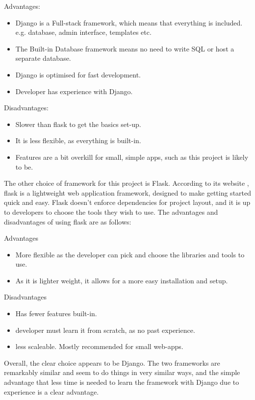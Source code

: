 \documentclass{l4proj}
\begin{document}
Advantages:
\begin{itemize}
    \item 
    Django is a Full-stack framework, which means that everything is included. e.g. database, admin interface, templates etc.
    \item 
    The Built-in Database framework means no need to write SQL or host a separate database.
    \item 
    Django is optimised for fast development.
    \item 
    Developer has experience with Django.
\end{itemize}
Disadvantages:
\begin{itemize}
    \item 
    Slower than flask to get the basics set-up.
    \item 
    It is less flexible, as everything is built-in.
    \item 
    Features are a bit overkill for small, simple apps, such as this project is likely to be.
\end{itemize}

The other choice of framework for this project is Flask. According to its website \citep{flask}, flask is a lightweight web application framework, designed to make getting started quick and easy. Flask doesn't enforce dependencies for project layout, and it is up to developers to choose the tools they wish to use. The advantages and disadvantages of using flask are as follows:

Advantages
\begin{itemize}
    \item 
    More flexible as the developer can pick and choose the libraries and tools to use.   
    \item
    As it is lighter weight, it allows for a more easy installation and setup.
\end{itemize}
Disadvantages
\begin{itemize}
    \item 
    Has fewer features built-in.
    \item 
    developer must learn it from scratch, as no past experience.  
    \item 
    less scaleable. Mostly recommended for small web-apps.
\end{itemize}

Overall, the clear choice appears to be Django. The two frameworks are remarkably similar and seem to do things in very similar ways, and the simple advantage that less time is needed to learn the framework with Django due to experience is a clear advantage.
\end{document}
